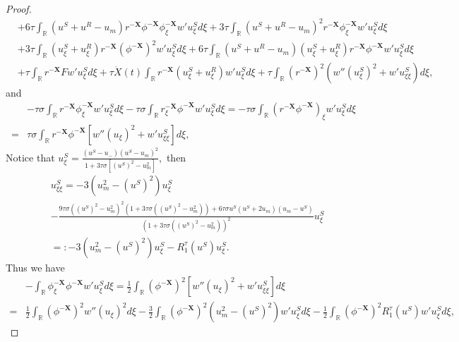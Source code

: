 \documentclass[10pt,reqno]{amsart}
\numberwithin{equation}{section}
\begin{document}
\begin{proof}
\begin{align*}
			&+6\tau\int_{\mathbb{R}}(u^S+u^R-u_{m})r^{-\mathbf{X}}\phi^{-\mathbf{X}}\phi_{\xi}^{-\mathbf{X}}w'u_{\xi}^Sd\xi+3\tau\int_{\mathbb{R}}(u^S+u^R-u_{m})^{2}r^{-\mathbf{X}}\phi_{\xi}^{-\mathbf{X}}w'u_{\xi}^Sd\xi\\
			&+3\tau\int_{\mathbb{R}}(u_{\xi}^S+u_{\xi}^R)r^{-\mathbf{X}}(\phi^{-\mathbf{X}})^2w'u_{\xi}^Sd\xi+6\tau\int_{\mathbb{R}}(u^S+u^R-u_{m})(u_{\xi}^S+u_{\xi}^R)r^{-\mathbf{X}}\phi^{-\mathbf{X}}w'u_{\xi}^Sd\xi\\
			&+\tau\int_{\mathbb{R}}r^{-\mathbf{X}}Fw'u_{\xi}^Sd\xi+\tau \dot{X}(t)\int_{\mathbb{R}}r^{-\mathbf{X}}\left(u_{\xi}^{S}+u_{\xi}^{R}\right)w'u_{\xi}^{S}d\xi+\tau\int_{\mathbb{R}}(r^{-\mathbf{X}})^{2}\left(w''(u_{\xi}^{S})^{2}+w'u_{\xi\xi}^{S}\right)d\xi,
		\end{align*}
		and
		\begin{align*}
			&-\tau\sigma\int_{\mathbb{R}}r^{-\mathbf{X}}\phi_{\xi}^{-\mathbf{X}}w'u_{\xi}^Sd\xi-\tau\sigma\int_{\mathbb{R}}r_{\xi}^{-\mathbf{X}}\phi^{-\mathbf{X}}w'u_{\xi}^Sd\xi
			=-\tau\sigma\int_{\mathbb{R}}(r^{-\mathbf{X}}\phi^{-\mathbf{X}})_{\xi}w'u_{\xi}^Sd\xi\\
			=&\tau\sigma\int_{\mathbb{R}}r^{-\mathbf{X}}\phi^{-\mathbf{X}}\left[w''(u_{\xi})^2+w'u_{\xi\xi}^S\right]d\xi,
		\end{align*}
		Notice that $u_{\xi}^S=\frac{(u^{S}-u_{-})(u^{S}-u_{m})^{2}}{1+3\tau \sigma\left[(u^{S})^{2}-u_{m}^{2}\right]},$ then 
		\begin{align*}
			&u_{\xi\xi}^S=-3(u_{m}^2-(u^S)^2)u_{\xi}^S\\
			&-\frac{9\tau\sigma\left((u^{S})^{2}-u_{m}^{2}\right)^{2}\left(1+3\tau\sigma\left((u^{S})^{2}-u_{m}^{2}\right)\right)+6\tau\sigma u^{S}(u^{S}+2u_{m})(u_{m}-u^{S})}{\left(1+3\tau\sigma\left((u^{S})^{2}-u_{m}^{2}\right)\right)^{2}}u_{\xi}^S\\
			&=:-3(u_{m}^2-(u^S)^2)u_{\xi}^S-R_{1}^{\tau}(u^{S})u_{\xi}^S.
		\end{align*}
		Thus we have
		\begin{align*}
			&-\int_{\mathbb{R}}\phi_{\xi}^{-\mathbf{X}}\phi^{-\mathbf{X}}w'u_{\xi}^Sd\xi
			=\frac{1}{2}\int_{\mathbb{R}}(\phi^{-\mathbf{X}})^2\left[w''(u_{\xi})^2+w'u_{\xi\xi}^S\right]d\xi\\
			=&\frac{1}{2}\int_{\mathbb{R}}(\phi^{-\mathbf{X}})^2w''(u_{\xi})^2d\xi-\frac{3}{2}\int_{\mathbb{R}}(\phi^{-\mathbf{X}})^2(u_{m}^2-(u^S)^2)w'u_{\xi}^Sd\xi-\frac{1}{2}\int_{\mathbb{R}}(\phi^{-\mathbf{X}})^2R_{1}^{\tau}(u^{S})w'u_{\xi}^Sd\xi,
		\end{align*}

\end{proof}
\end{document}
